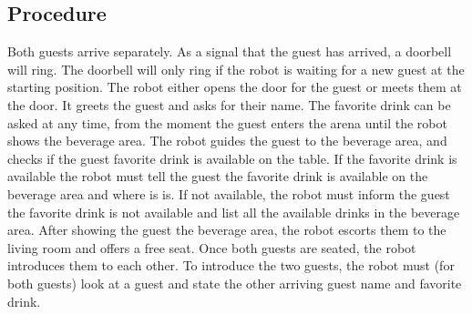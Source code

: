 \subsection*{Procedure}
Both guests arrive separately. As a signal that the guest has arrived, a doorbell will ring. 
The doorbell will only ring if the robot is waiting for a new guest at the starting position.
The robot either opens the door for the guest or meets them at the door.
It greets the guest and asks for their name.
The favorite drink can be asked at any time, from the moment the guest enters the arena until the robot shows the beverage area.
The robot guides the guest to the beverage area, and checks if the guest favorite drink is available on the table.
If the favorite drink is available the robot must tell the guest the favorite drink is available on the beverage area and where is is. If not available, the robot must inform the guest the favorite drink is not available and list all the available drinks in the beverage area.
After showing the guest the beverage area, the robot escorts them to the living room and offers a free seat. 
Once both guests are seated, the robot introduces them to each other. To introduce the two guests, the robot must (for both guests) look at a guest and state the other arriving guest name and favorite drink.
